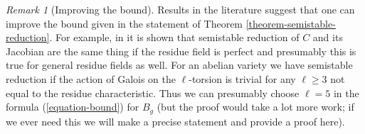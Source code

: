 \documentclass{stacks-project}
\theoremstyle{plain}
\theoremstyle{definition}
\theoremstyle{remark}
\newtheorem{remark}[subsection]{Remark}
\numberwithin{equation}{subsection}
\begin{document}
\begin{remark}[Improving the bound]
\label{remark-improving-bound}
Results in the literature suggest that one can improve the bound
given in the statement of Theorem \ref{theorem-semistable-reduction}.
For example, in \cite{DM} it is shown that semistable reduction
of $C$ and its Jacobian are the same thing if the residue field is perfect
and presumably this is true for general residue fields as well.
For an abelian variety we have semistable reduction if the action of Galois
on the $\ell$-torsion is trivial for any $\ell \geq 3$ not equal to the
residue characteristic. Thus we can presumably choose $\ell = 5$
in the formula (\ref{equation-bound}) for $B_g$
(but the proof would take a lot more work; if we ever need this
we will make a precise statement and provide a proof here).
\end{remark}








\end{document}
